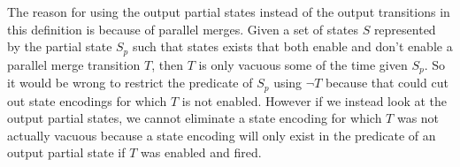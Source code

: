 The reason for using the output partial states instead of the output transitions in this definition is because of parallel merges. Given a set of states $S$ represented by the partial state $S_p$ such that states exists that both enable and don't enable a parallel merge transition $T$, then $T$ is only vacuous some of the time given $S_p$. So it would be wrong to restrict the predicate of $S_p$ using $\neg T$ because that could cut out state encodings for which $T$ is not enabled. However if we instead look at the output partial states, we cannot eliminate a state encoding for which $T$ was not actually vacuous because a state encoding will only exist in the predicate of an output partial state if $T$ was enabled and fired.

